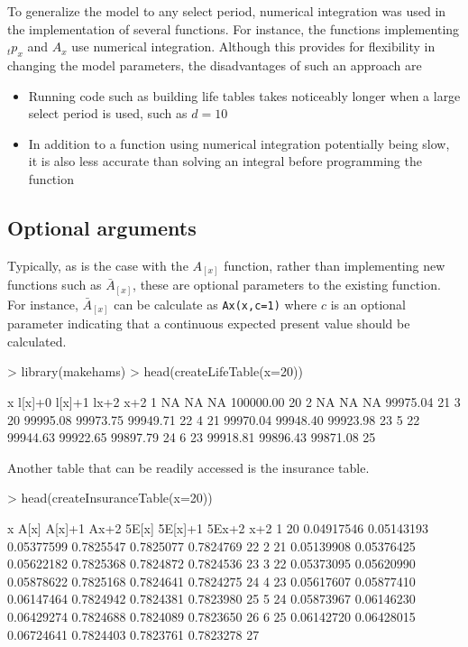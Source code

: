 \documentclass{article}
\begin{document}
To generalize the model to any select period, numerical integration was used in the implementation of several functions. For instance, the functions implementing ${}_tp_{x}$ and $A_{x}$ use numerical integration. Although this provides for flexibility in changing the model parameters, the disadvantages of such an approach are
\begin{itemize}
\item Running code such as building life tables takes noticeably longer when a large select period is used, such as $d=10$
\item In addition to a function using numerical integration potentially being slow, it is also less accurate than solving an integral before programming the function
\end{itemize}

\subsection{Optional arguments}
Typically, as is the case with the $A_{[x]}$ function, rather than implementing new functions such as $\bar{A}_{[x]}$, these are optional parameters to the existing function. For instance, $\bar{A}_{[x]}$ can be calculate as \texttt{Ax(x,c=1)} where $c$ is an optional parameter indicating that a continuous expected present value should be calculated.

\begin{Schunk}
\begin{Sinput}
> library(makehams)
> head(createLifeTable(x=20))
\end{Sinput}
\begin{Soutput}
   x   l[x]+0   l[x]+1      lx+2 x+2
1 NA       NA       NA 100000.00  20
2 NA       NA       NA  99975.04  21
3 20 99995.08 99973.75  99949.71  22
4 21 99970.04 99948.40  99923.98  23
5 22 99944.63 99922.65  99897.79  24
6 23 99918.81 99896.43  99871.08  25
\end{Soutput}
\end{Schunk}

Another table that can be readily accessed is the insurance table.
\begin{Schunk}
\begin{Sinput}
> head(createInsuranceTable(x=20))
\end{Sinput}
\begin{Soutput}
   x       A[x]     A[x]+1       Ax+2     5E[x]   5E[x]+1     5Ex+2 x+2
1 20 0.04917546 0.05143193 0.05377599 0.7825547 0.7825077 0.7824769  22
2 21 0.05139908 0.05376425 0.05622182 0.7825368 0.7824872 0.7824536  23
3 22 0.05373095 0.05620990 0.05878622 0.7825168 0.7824641 0.7824275  24
4 23 0.05617607 0.05877410 0.06147464 0.7824942 0.7824381 0.7823980  25
5 24 0.05873967 0.06146230 0.06429274 0.7824688 0.7824089 0.7823650  26
6 25 0.06142720 0.06428015 0.06724641 0.7824403 0.7823761 0.7823278  27
\end{Soutput}
\end{Schunk}
\end{document}
